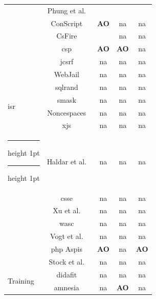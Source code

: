\documentclass[10pt,journal,compsoc]{IEEEtran}
\makeatletter
\newcommand{\tick}{\ding{52}}
\newcommand{\thickhline}{%
    \noalign {\ifnum 0=`}\fi \hrule height 1pt
    \futurelet \reserved@a \@xhline
}
\makeatother
\begin{document}
\begin{table}
\begin{threeparttable}
\begin{small}
{\begin{tabular}{l|c|ccc}
  &   Phung et al.~\cite{PSC09} & \tick & \tick & \tick \\
  &   ConScript~\cite{ML10} & {\bf AO} & {\sc na} & {\sc na} \\
  &   CsFire~\cite{DDHPJ10} & \tick & {\sc na} & {\sc na} \\
  &   {\sc csp}~\cite{SSM10} & {\bf AO} & {\bf AO} & {\sc na} \\
  &   j{\sc csrf}~\cite{PS11} & {\sc na} & {\sc na} & {\sc na} \\
  &   WebJail~\cite{VDDPJ11} & {\sc na} & {\sc na} & {\sc na} \\
  \hline
  \multirow{4}{*}{{\sc isr}}
  &   {\sc sql}rand~\cite{BK04} & {\sc na} & {\sc na} & {\sc na} \\
  &   {\sc sm}ask~\cite{JB07} & {\sc na} & {\sc na} & {\sc na} \\
  &   Noncespaces~\cite{GC09} & {\sc na} & {\sc na} & {\sc na} \\
  &   x{\sc js}~\cite{APKLM10} & {\sc na} & {\sc na} & {\sc na} \\
  \thickhline
  \thickhline
  \multirow{7}{*}{Taint Tracking}
  &   Haldar et al.~\cite{HCF05}  & {\sc na} & {\sc na} & {\sc na} \\
  &   {\sc csse}~\cite{PB05} & {\sc na} & {\sc na} & {\sc na} \\
  &   Xu et al.~\cite{XBS06}  & {\sc na} & {\sc na} & {\sc na} \\
  &   {\sc wasc}~\cite{NLC07} & {\sc na} & {\sc na} & {\sc na} \\
  &   Vogt et al.~\cite{VFJKKV07}  & {\sc na} & {\sc na} & {\sc na} \\
  &   {\sc php} Aspis~\cite{PMP11} & {\bf AO} & {\sc na} & {\bf AO} \\
  &   Stock et al.~\cite{SLMS14} & {\sc na} & {\sc na} & {\sc na} \\
  \hline
  \multirow{6}{*}{Training}
  &   {\sc didafit}~\cite{LLW02} & {\sc na} & {\sc na} & {\sc na} \\
  &   {\sc amnesia}~\cite{HO05,HO06,HO05b} & {\sc na} & {\bf AO} & {\sc na} \\

\end{tabular}}
\end{small}
\end{threeparttable}
\end{table}
\end{document}
